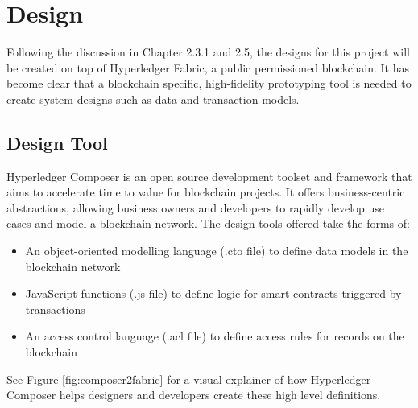 \chapter{Design}
\graphicspath{{Chapter5/Figs/Raster/}{Chapter5/Figs/Tex/}{Chapter5/Figs/}}

Following the discussion in Chapter 2.3.1 and 2.5, the designs for this project
will be created on top of Hyperledger Fabric, a public permissioned blockchain.
It has become clear that a blockchain specific, high-fidelity prototyping tool is needed
to create system designs such as data and transaction models.

\section{Design Tool}

Hyperledger Composer is an open source development toolset and framework that aims to
accelerate time to value for blockchain projects. It offers business-centric
abstractions, allowing business owners and developers to rapidly develop
use cases and model a blockchain network. The design tools offered take the forms of:
\begin{itemize}
	\setlength\itemsep{0em}
	\item An object-oriented modelling language (.cto file) to define data models in
	      the blockchain network
	\item JavaScript functions (.js file) to define logic for smart contracts triggered by transactions
	\item An access control language (.acl file) to define access rules for records on the blockchain\\
	      \citep{official2018composer}
\end{itemize}

See Figure \ref{fig:composer2fabric} for a visual explainer of how Hyperledger Composer
helps designers and developers create these high level definitions.

